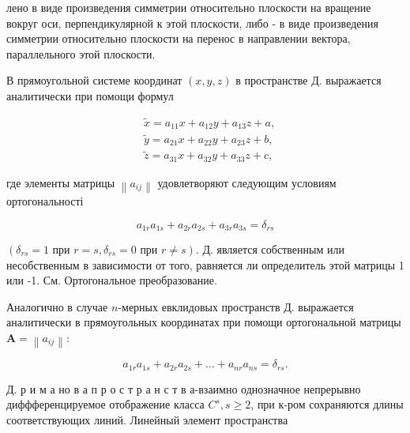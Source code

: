 \documentclass[10pt]{article}
\begin{document}
лено в виде произведения симметрии относительно плоскости на вращение вокруг оси, перпендикулярной к этой плоскости, либо - в виде произведения симметрии относительно плоскости на перенос в направлении вектора, параллельного этой плоскости.



В прямоугольной системе координат $(x, y, z)$ в пространстве Д. выражается аналитически при помощи формул



\[

\begin{aligned}

& \tilde{x}=a_{11} x+a_{12} y+a_{13} z+a, \\

& \tilde{y}=a_{21} x+a_{22} y+a_{23} z+b, \\

& \tilde{z}=a_{31} x+a_{32} y+a_{33} z+c,

\end{aligned}

\]



где элементы матрицы $\left\|a_{i j}\right\|$ удовлетворяют следующим условиям ортогональності



\[

a_{1 r} a_{1 s}+a_{2 r} a_{2 s}+a_{3 r} a_{3 s}=\delta_{r s}

\]



$\left(\delta_{r s}=1\right.$ при $r=s, \delta_{r s}=0$ при $\left.r \neq s\right)$. Д. является собственным или несобственным в зависимости от того, равняется ли определитель этой матрицы 1 или -1. См. Ортогональное преобразование.



Аналогично в случае $n$-мерных евклидовых пространств Д. выражается аналитически в прямоугольных координатах при помощи ортогональной матрицы $\boldsymbol{A}=\left\|a_{i j}\right\|:$



\[

a_{1 r} a_{1 s}+a_{2 r} a_{2 s}+\ldots+a_{n r} a_{n s}=\delta_{r s} .

\]



Д. р и м а но в а п р о с т р а н с т в а-взаимно однозначное непрерывно диффференцируемое отображение класса $C^{s}, s \geqslant 2$, при к-ром сохраняются длины соответствующих линий. Линейный элемент пространства
\end{document}
